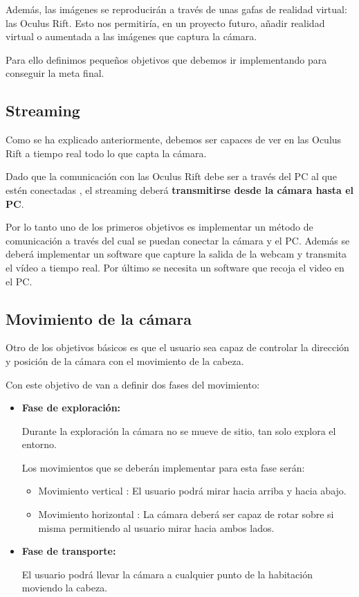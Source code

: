 \documentclass[twoside, 11pt]{epstfg}
\begin{document}
Además, las imágenes se reproducirán a través de unas gafas de realidad virtual: las Oculus Rift. Esto nos permitiría, en un proyecto futuro, añadir realidad virtual o aumentada a las imágenes que captura la cámara.

Para ello definimos pequeños objetivos que debemos ir implementando para conseguir la meta final.

\subsection{Streaming}
Como se ha explicado anteriormente, debemos ser capaces de ver en las Oculus Rift a tiempo real todo lo que capta la cámara.

Dado que la comunicación con las Oculus Rift debe ser a través del PC al que estén conectadas , el streaming deberá \textbf{transmitirse desde la cámara hasta el PC}.

Por lo tanto uno de los primeros objetivos es implementar un método de comunicación a través del cual se puedan conectar  la cámara y el PC. Además se deberá implementar un software que capture la salida de la webcam y transmita el vídeo a tiempo real. Por último se necesita un software que recoja el video en el PC.

\subsection{Movimiento de la cámara}
Otro de los objetivos básicos es que el usuario sea capaz de controlar la dirección y posición de la cámara con el movimiento de la cabeza.

Con este objetivo de van a definir dos fases del movimiento:
\begin{itemize}
	\item \textbf{Fase de exploración:}
	
	Durante la exploración la cámara no se mueve de sitio, tan solo explora el entorno.
	
	Los movimientos que se deberán implementar para esta fase serán:
	\begin{itemize}
		\item Movimiento vertical : El usuario podrá mirar hacia arriba y hacia abajo.
		\item Movimiento horizontal : La cámara deberá ser capaz de rotar sobre si misma permitiendo al usuario mirar hacia ambos lados.
	\end{itemize}
	\item \textbf{Fase de transporte:}
	
	El usuario podrá llevar la cámara a cualquier punto de la habitación moviendo la cabeza.
	
\end{itemize}
\end{document}
